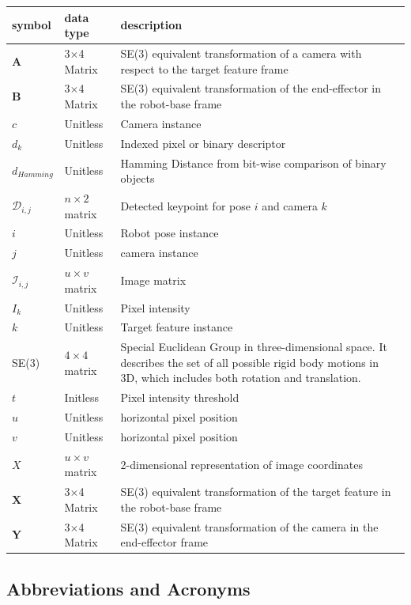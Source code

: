 \documentclass[12pt]{article}
\begin{document}
\renewcommand{\arraystretch}{1.2}
\noindent \begin{longtable*}{l l p{12cm}} \toprule
\textbf{symbol} & \textbf{data type} & \textbf{description}\\
\midrule 
$\textbf{A}$ & 3$\times$4 Matrix & SE(3) equivalent transformation of a camera 
with respect to the target feature frame
\\
$\textbf{B}$ & 3$\times$4 Matrix & SE(3) equivalent transformation of the 
end-effector in the robot-base frame
\\
$c$ &	Unitless & Camera instance
\\
$d_{k}$ & Unitless & Indexed pixel or binary descriptor 
\\
$d_{Hamming}$ & Unitless & Hamming Distance from bit-wise comparison of binary objects
\\
$\mathit{\mathcal{D}_{i, j}}$ & $n \times 2$ matrix & Detected keypoint for pose $i$
and camera $k$
\\
$i$ & Unitless & Robot pose instance
\\
$j$ & Unitless & camera instance
\\
$\mathit{\mathcal{I}_{i, j}}$ & $u \times v$ matrix & Image matrix
\\
$I_{k}$ & Unitless & Pixel intensity
\\
$k$ &	Unitless & Target feature instance
\\
SE(3) & $4\times 4$ matrix & Special Euclidean Group in three-dimensional space. It describes the set of 
all possible rigid body motions in 3D, which includes both rotation and translation.
\\
$t$ & Initless & Pixel intensity threshold
\\
$u$ & Unitless & horizontal pixel position
\\
$v$ & Unitless & horizontal pixel position
\\
$\mathit{X}$ & $u \times v$ matrix & 2-dimensional representation of image coordinates 
\\
$\textbf{X}$ & 3$\times$4 Matrix & SE(3) equivalent transformation of the target 
feature in the robot-base frame
\\
$\textbf{Y}$ & 3$\times$4 Matrix & SE(3) equivalent transformation of the camera 
in the end-effector frame
\\ 
\bottomrule
\end{longtable*}

\subsection{Abbreviations and Acronyms}
\end{document}
